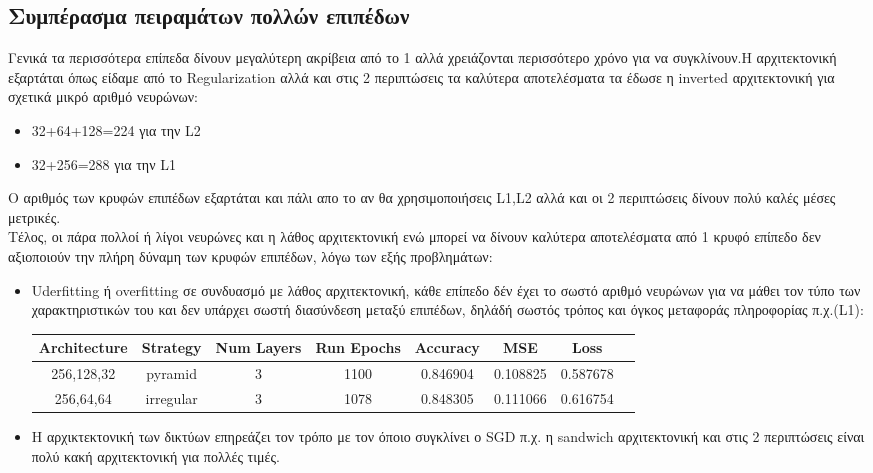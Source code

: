 \documentclass[a4paper,11pt]{article}
\begin{document}
\subsection{Συμπέρασμα πειραμάτων πολλών επιπέδων}
Γενικά τα περισσότερα επίπεδα δίνουν μεγαλύτερη ακρίβεια από το 1 αλλά χρειάζονται περισσότερο χρόνο για να συγκλίνουν.Η αρχιτεκτονική εξαρτάται όπως είδαμε 
από το Regularization αλλά και στις 2 περιπτώσεις τα καλύτερα αποτελέσματα τα έδωσε η inverted αρχιτεκτονική για σχετικά μικρό αριθμό νευρώνων:
\begin{itemize}
    \item 32+64+128=224 για την L2
    \item 32+256=288 για την L1
\end{itemize}
Ο αριθμός των κρυφών επιπέδων εξαρτάται και πάλι απο το αν θα χρησιμοποιήσεις L1,L2 αλλά και οι 2 περιπτώσεις δίνουν πολύ καλές μέσες μετρικές.\\
Τέλος, οι πάρα πολλοί ή λίγοι  νευρώνες και η λάθος αρχιτεκτονική ενώ μπορεί να δίνουν καλύτερα αποτελέσματα από 1 κρυφό επίπεδο δεν αξιοποιούν την πλήρη δύναμη 
των κρυφών επιπέδων, λόγω των εξής προβλημάτων:
\begin{itemize}
    \item Uderfitting ή overfitting σε συνδυασμό με λάθος αρχιτεκτονική, κάθε επίπεδο δέν έχει το σωστό αριθμό νευρώνων για να μάθει τον τύπο των χαρακτηριστικών του και δεν υπάρχει σωστή διασύνδεση μεταξύ 
    επιπέδων, δηλάδή σωστός τρόπος και όγκος μεταφοράς πληροφορίας π.χ.(L1):
    \begin{table}[h!]
        \centering
        \label{tab:selected-architectures}
        \begin{tabular}{c c c c c c c c}
        \hline
         \textbf{Architecture} & \textbf{Strategy} & \textbf{Num Layers} & \textbf{Run Epochs} & \textbf{Accuracy} & \textbf{MSE} & \textbf{Loss} \\
        \hline
        256,128,32 & pyramid  & 3 & 1100 & 0.846904 & 0.108825 & 0.587678 \\
        256,64,64  & irregular & 3 & 1078 & 0.848305 & 0.111066 & 0.616754 \\
        \hline
        \end{tabular}
        \end{table}
    \item Η αρχικτεκτονική των δικτύων επηρεάζει τον τρόπο με τον όποιο συγκλίνει ο SGD π.χ. η sandwich αρχιτεκτονική και στις 2 περιπτώσεις είναι πολύ  κακή αρχιτεκτονική για πολλές τιμές.
\end{itemize}
\end{document}
